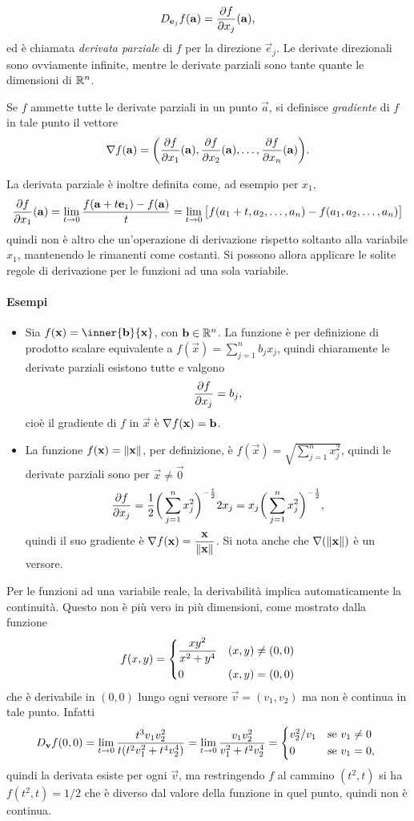 \[
D_{\mathbf{e}_j}f(\mathbf{a})=\frac{\partial {f}}{\partial {x_j}}(\mathbf{a}),
\]
ed è chiamata \emph{derivata parziale} di $f$ per la direzione $\vec e_j$.
Le derivate direzionali sono ovviamente infinite, mentre le derivate parziali sono tante quante le dimensioni di $\mathbb{R}^n$.
\begin{definizione} \label{d:grad}
Se $f$ ammette tutte le derivate parziali in un punto $\vec a$, si definisce \emph{gradiente} di $f$ in tale punto il vettore
\begin{equation} \label{eq:grad}
\nabla f(\mathbf{a})=\bigg(\frac{\partial {f}}{\partial {x_1}}(\mathbf{a}),\frac{\partial {f}}{\partial {x_2}}(\mathbf{a}),\dots,\frac{\partial {f}}{\partial {x_n}}(\mathbf{a})\bigg).
\end{equation}
\end{definizione}
La derivata parziale è inoltre definita come, ad esempio per $x_1$,
\[
\frac{\partial {f}}{\partial {x_1}}(\mathbf{a})=\lim_{t\to 0}\frac{f(\mathbf{a}+t\mathbf{e}_1)-f(\mathbf{a})}{t}=\lim_{t\to 0}\big[f(a_1+t,a_2,\dots,a_n)-f(a_1,a_2,\dots,a_n)\big]
\]
quindi non è altro che un'operazione di derivazione rispetto soltanto alla variabile $x_1$, mantenendo le rimanenti come costanti. Si possono allora applicare le solite regole di derivazione per le funzioni ad una sola variabile.
\paragraph{Esempi}
\begin{itemize}
\item Sia $f(\vec x)=\inner{\vec b}{\vec x}$, con $\mathbf{b}\in\mathbb{R}^n$. La funzione è per definizione di prodotto scalare equivalente a $f(\vec x)=\sum_{j=1}^nb_jx_j$, quindi chiaramente le derivate parziali esistono tutte e valgono
\[
\frac{\partial {f}}{\partial {x_j}}=b_j,
\]
cioè il gradiente di $f$ in $\vec x$ è $\nabla f(\mathbf{x})=\mathbf{b}$.
\item La funzione $f(\mathbf{x})=\lVert\mathbf{x}\rVert$, per definizione, è $f(\vec x)=\sqrt{\sum_{j=1}^nx_j^2}$, quindi le derivate parziali sono per $\vec x\neq\vec 0$
\[
\frac{\partial {f}}{\partial {x_j}}=\frac12\bigg(\sum_{j=1}^nx_j^2\bigg)^{-\frac{1}{2}}2x_j=x_j\bigg(\sum_{j=1}^nx_j^2\bigg)^{-\frac{1}{2}},
\]
quindi il suo gradiente è $\nabla f(\mathbf{x})=\dfrac{\mathbf{x}}{\lVert\mathbf{x}\rVert}$. Si nota anche che $\nabla(\lVert\mathbf{x}\rVert)$ è un versore.
\end{itemize}

Per le funzioni ad una variabile reale, la derivabilità implica automaticamente la continuità. Questo non è più vero in più dimensioni, come mostrato dalla funzione
\[
f(x,y)=\begin{dcases}
\frac{xy^2}{x^2+y^4}	&(x,y)\neq(0,0)\\
0					&(x,y)=(0,0)
\end{dcases}
\]
che è derivabile in $(0,0)$ lungo ogni versore $\vec v=(v_1,v_2)$ ma non è continua in tale punto. Infatti
\[
D_{\vec v}f(0,0)=\lim_{t\to 0}\frac{t^3v_1v_2^2}{t(t^2v_1^2+t^4v_2^4)}=\lim_{t\to 0}\frac{v_1v_2^2}{v_1^2+t^2v_2^4}=
\begin{cases*}
v_2^2/v_1	&se $v_1\neq 0$\\
0			&se $v_1=0$,
\end{cases*}
\]
quindi la derivata esiste per ogni $\vec v$, ma restringendo $f$ al cammino $(t^2,t)$ si ha $f(t^2,t)=1/2$ che è diverso dal valore della funzione in quel punto, quindi non è continua.

